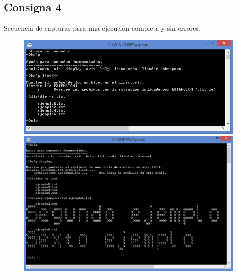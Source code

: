 \documentclass[a4paper,12pt]{article}
\begin{document}
\subsection{Consigna 4}
Secuencia de capturas para una ejecución completa y sin errores.

\begin{figure}[h!]
    \centering
    \begin{adjustbox}{max width=\textwidth, center}
        \includegraphics{C4/S1_C4.PNG}
    \end{adjustbox}
    \begin{adjustbox}{max width=\textwidth, center}
        \includegraphics{C4/S2_C4.PNG}
    \end{adjustbox}
\end{figure}
\end{document}
